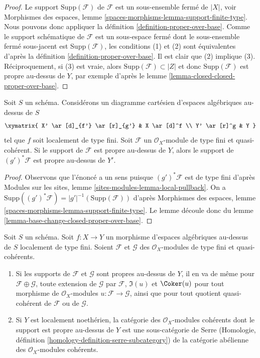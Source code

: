 \begin{proof}
Le support $\text{Supp}(\mathcal{F})$ de $\mathcal{F}$ est un sous-ensemble fermé
de $|X|$, voir Morphismes des espaces, lemme
\ref{spaces-morphisms-lemma-support-finite-type}.
Nous pouvons donc appliquer la définition \ref{definition-proper-over-base}.
Comme le support schématique de $\mathcal{F}$ est un sous-espace fermé
dont le sous-ensemble fermé sous-jacent est $\text{Supp}(\mathcal{F})$,
les conditions (1) et (2) sont équivalentes d'après la
définition \ref{definition-proper-over-base}.
Il est clair que (2) implique (3).
Réciproquement, si (3) est vraie, alors
$\text{Supp}(\mathcal{F}) \subset |Z|$
et donc $\text{Supp}(\mathcal{F})$
est propre au-dessus de $Y$, par exemple d'après le
lemme \ref{lemma-closed-closed-proper-over-base}.
\end{proof}

\begin{lemma}
\label{lemma-base-change-module-support-proper-over-base}
Soit $S$ un schéma.
Considérons un diagramme cartésien d'espaces algébriques au-dessus de $S$
$$
\xymatrix{
X' \ar[d]_{f'} \ar[r]_{g'} & X \ar[d]^f \\
Y' \ar[r]^g & Y
}
$$
tel que $f$ soit localement de type fini. Soit $\mathcal{F}$ un
$\mathcal{O}_X$-module de type fini et quasi-cohérent.
Si le support de $\mathcal{F}$ est propre au-dessus de $Y$, alors
le support de $(g')^*\mathcal{F}$ est propre au-dessus de $Y'$.
\end{lemma}

\begin{proof}
Observons que l'énoncé a un sens puisque
$(g')^*\mathcal{F}$ est de type fini d'après
Modules sur les sites, lemme \ref{sites-modules-lemma-local-pullback}.
On a $\text{Supp}((g')^*\mathcal{F}) = |g'|^{-1}(\text{Supp}(\mathcal{F}))$
d'après Morphismes des espaces, lemme \ref{spaces-morphisms-lemma-support-finite-type}.
Le lemme découle donc du
lemme \ref{lemma-base-change-closed-proper-over-base}.
\end{proof}

\begin{lemma}
\label{lemma-cat-module-support-proper-over-base}
Soit $S$ un schéma.
Soit $f : X \to Y$ un morphisme d'espaces algébriques au-dessus de $S$
localement de type fini. Soient $\mathcal{F}$ et $\mathcal{G}$
des $\mathcal{O}_X$-modules de type fini et quasi-cohérents.
\begin{enumerate}
\item Si les supports de $\mathcal{F}$ et $\mathcal{G}$
sont propres au-dessus de $Y$, il en va de même
pour $\mathcal{F} \oplus \mathcal{G}$, toute extension
de $\mathcal{G}$ par $\mathcal{F}$, $\Im(u)$ et $\Coker(u)$
pour tout morphisme de $\mathcal{O}_X$-modules $u : \mathcal{F} \to \mathcal{G}$,
ainsi que pour tout quotient quasi-cohérent de $\mathcal{F}$ ou de $\mathcal{G}$.
\item Si $Y$ est localement noethérien, la catégorie des
$\mathcal{O}_X$-modules cohérents dont le support est propre au-dessus de
$Y$ est une sous-catégorie de Serre (Homologie, définition
\ref{homology-definition-serre-subcategory})
de la catégorie abélienne des $\mathcal{O}_X$-modules cohérents.
\end{enumerate}
\end{lemma}

